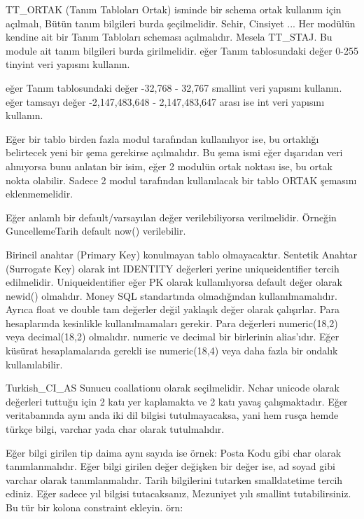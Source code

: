 \documentclass[10pt,a4paper,draft]{article}
\begin{document}
  			TT\_ORTAK  (Tanım Tabloları Ortak) isminde bir schema ortak kullanım 
  için açılmalı, Bütün tanım bilgileri burda şeçilmelidir. 			Sehir, Cinsiyet 
  ...		 
  			Her modülün kendine ait bir Tanım Tabloları scheması açılmalıdır. 
  Mesela TT\_STAJ. Bu module ait tanım bilgileri burda girilmelidir. 		 
   eğer Tanım tablosundaki değer 0-255  tinyint veri yapısını kullanın.
  		 
   eğer Tanım tablosundaki değer  -32,768 - 32,767   smallint veri yapısını 
  kullanın.		 
   eğer tamsayı değer  -2,147,483,648 - 2,147,483,647 arası ise int veri 
  yapısını kullanın.		 
  
  
  			Eğer bir tablo birden fazla modul tarafından kullanılıyor ise, 
  bu ortaklığı belirtecek yeni bir şema gerekirse açılmalıdır. 
  Bu şema ismi eğer dışarıdan veri alınıyorsa bunu anlatan bir isim,
  eğer 2 modulün ortak noktası ise, bu ortak nokta olabilir.
  Sadece 2 modul tarafından kullanılacak bir tablo ORTAK şemasını eklenmemelidir.
  
  
  
  
  			Eğer anlamlı bir default/varsayılan değer verilebiliyorsa verilmelidir.
    Örneğin GuncellemeTarih default now() verilebilir.
  
  			Birincil anahtar (Primary Key) konulmayan tablo olmayacaktır.		 
  			Sentetik Anahtar (Surrogate Key) olarak int IDENTITY değerleri yerine 
  uniqueidentifier tercih edilmelidir.		 
  			Uniqueidentifier eğer PK olarak kullanılıyorsa default değer olarak 
  newid() olmalıdır.		 
  			 Money SQL standartında olmadığından kullanılmamalıdır. Ayrıca float ve 
  double tam değerler değil 			 yaklaşık değer olarak çalışırlar. Para 
  hesaplarında kesinlikle kullanılmamaları gerekir.		 
  			Para değerleri numeric(18,2) veya decimal(18,2) olmalıdır.	
  numeric ve decimal bir birlerinin alias'ıdır. 
    Eğer küsürat hesaplamalarıda gerekli ise numeric(18,4) veya daha fazla
    bir ondalık kullanılabilir.

  
  			Turkish\_CI\_AS Sunucu coallationu olarak seçilmelidir. Nchar unicode 
  olarak değerleri tuttuğu için 	2 katı yer kaplamakta ve 2 katı yavaş 
  çalışmaktadır. Eğer veritabanında aynı anda iki dil bilgisi tutulmayacaksa, 
  yani			hem rusça hemde türkçe bilgi,  varchar yada char olarak tutulmalıdır.
  		 
 Eğer bilgi girilen tip daima aynı sayıda ise örnek: Posta Kodu gibi 
  char olarak tanımlanmalıdır.		 
  			Eğer bilgi girilen değer değişken bir değer ise, ad soyad gibi varchar 
  olarak tanımlanmalıdır.		 
  			Tarih bilgilerini tutarken smalldatetime tercih ediniz. 			
  Eğer sadece 
  yıl bilgisi tutacaksanız, Mezuniyet yılı smallint tutabilirsiniz. Bu tür bir 
  kolona constraint ekleyin.			örn: 
  
\end{document}
